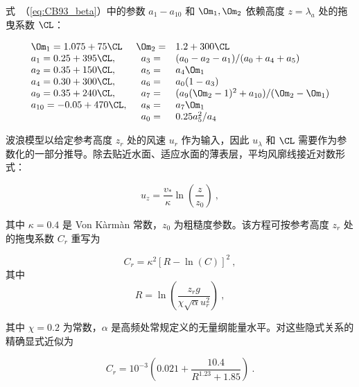 \noindent
式~（\ref{eq:CB93_beta}）中的参数 $a_1-a_{10}$ 和 $\Om_1,\Om_2$ 依赖高度 $z=\lambda_a$ 处的拖曳系数 $\CL$：


\begin{equation} \begin{array}{lcl}
\Om_1=1.075+75\CL  &\Om_2=& 1.2+300\CL                     \\
a_1=0.25+395\CL,    &a_3 =& (a_0-a_2-a_1)/(a_0+a_4+a_5)    \\
a_2=0.35+150\CL,    &a_5 =& a_4\Om_1                       \\
a_4=0.30+300\CL,    &a_6 =& a_0(1-a_3)                     \\
a_9=0.35+240\CL,    &a_7 =&
                     (a_9(\Om_2-1)^2+a_{10})/(\Om_2-\Om_1) \\
a_{10}=-0.05+470\CL,&a_8 =& a_7\Om_1                       \\
                    &a_0 =& 0.25 a_5^2/a_4
\end{array} \label{eq:omapar} \end{equation}

\noindent
波浪模型以给定参考高度 $z_r$ 处的风速 $u_r$ 作为输入，因此 $u_\lambda$ 和 $\CL$ 需要作为参数化的一部分推导。除去贴近水面、适应水面的薄表层，平均风廓线接近对数形式：


\begin{equation}
u_z = \frac{v_\ast}{\kappa} \ln \left ( \frac{z}{z_0} \right )
\: , \label{eq:u_z}
\end{equation}

\noindent
其中 $\kappa = 0.4 $ 是 Von K\`{a}rm\`{a}n 常数，$z_0$ 为粗糙度参数。该方程可按参考高度 $z_r$ 处的拖曳系数 $C_r$ 重写为 \citep{art:Cha95}


\begin{equation}
C_r = \kappa^2 \left [ R - \ln(C) \right ] ^2
\: , \label{eq:C95C} \end{equation} 其中 \begin{equation}
R = \ln \left ( \frac{z_r g}{\chi \sqrt{\alpha} u_r^2} \right )
\: , \label{eq:C95R} \end{equation}

\noindent
其中 $\chi = 0.2$ 为常数，$\alpha$ 是高频处常规定义的无量纲能量水平。对这些隐式关系的精确显式近似为

\begin{equation}
C_r = 10^{-3} \left ( 0.021 + \frac{10.4}{R^{1.23}+1.85} \right )
\: . \label{eq:C95Ca} \end{equation}


